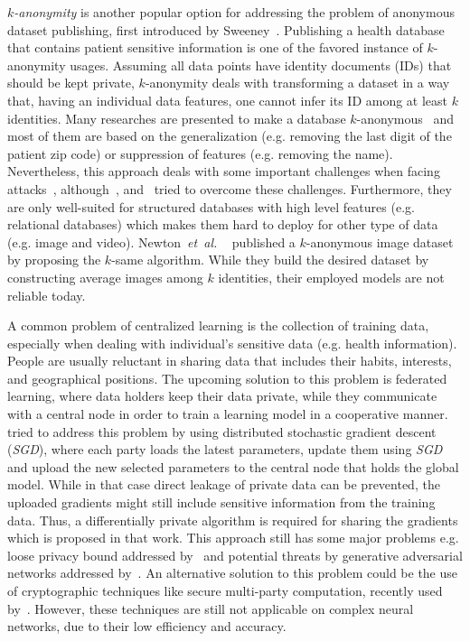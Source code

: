\documentclass[10pt,journal,compsoc]{IEEEtran}
\newcommand{\latinphrase}[1]{\textit{#1}}
\newcommand{\etal}{\latinphrase{et~al. }}
\begin{document}
\emph{$k$-anonymity} is another popular option for addressing the problem of anonymous dataset publishing, first introduced by Sweeney~\cite{sweeney2002}. Publishing a health database that contains patient sensitive information is one of the favored instance of $k$-anonymity usages. Assuming all data points have identity documents (IDs) that should be kept private, $k$-anonymity deals with transforming a dataset in a way that, having an individual data features, one cannot infer its ID among at least $k$ identities. Many researches are presented to make a database $k$-anonymous~\cite{fung2005,wang2004,bayardo2005,lefevre2006} and most of them are based on the generalization (e.g. removing the last digit of the patient zip code) or suppression of features (e.g. removing the name). Nevertheless, this approach deals with some important challenges when facing attacks~\cite{aggarwal2008}, although~\cite{machanavajjhala2007}, \cite{li2007} and~\cite{rebollo2010} tried to overcome these challenges. Furthermore, they are only well-suited for structured databases with high level features (e.g. relational databases) which makes them hard to deploy for other type of data (e.g. image and video). Newton~\etal~\cite{newton2005} published a $k$-anonymous image dataset by proposing the $k$-same algorithm. While they build the desired dataset by constructing average images among $k$ identities, their employed models are not reliable today.


A common problem of centralized learning is the collection of training data, especially when dealing with individual's sensitive data (e.g. health information). People are usually reluctant in sharing data that includes their habits, interests, and geographical positions. The upcoming solution to this problem is federated learning, where data holders keep their data private, while they communicate with a central node in order to train a learning model in a cooperative manner. \cite{shokri2015} tried to address this problem by using distributed stochastic gradient descent (\emph{SGD}), where each party loads the latest parameters, update them using \emph{SGD} and upload the new selected parameters to the central node that holds the global model. While in that case direct leakage of private data can be prevented, the uploaded gradients might still include sensitive information from the training data. Thus, a differentially private algorithm is required for sharing the gradients which is proposed in that work. This approach still has some major problems e.g. loose privacy bound addressed by~\cite{papernot2016} and potential threats by generative adversarial networks addressed by~\cite{hitaj2017}. An alternative solution to this problem could be the use of cryptographic techniques like secure multi-party computation, recently used by~\cite{mohassel2017}. However, these techniques are still not applicable on complex neural networks, due to their low efficiency and accuracy. 
\end{document}

